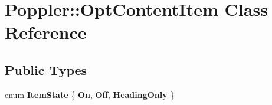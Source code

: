 \hypertarget{class_poppler_1_1_opt_content_item}{}\section{Poppler\+:\+:Opt\+Content\+Item Class Reference}
\label{class_poppler_1_1_opt_content_item}
\subsection*{Public Types}
\begin{DoxyCompactItemize}
\item 
\mbox{\label{class_poppler_1_1_opt_content_item_a3f08dd40d5396a926c8c696772044765}} 
enum {\bfseries Item\+State} \{ {\bfseries On}, 
{\bfseries Off}, 
{\bfseries Heading\+Only}
 \}
\end{DoxyCompactItemize}
